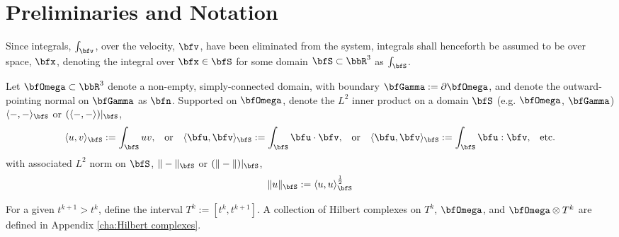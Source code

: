 \section*{Preliminaries and Notation}
    Since integrals, $\int_{\bfv}$, over the velocity, $\bfv$, have been eliminated from the system, integrals shall henceforth be assumed to be over space, $\bfx$, denoting the integral over $\bfx  \in  \bfS$ for some domain $\bfS  \subset  \bbR^{3}$ as $\int_{\bfS}$.

    Let $\bfOmega  \subset  \bbR^{3}$ denote a  non-empty, simply-connected domain, with boundary $\bfGamma  :=  \partial\bfOmega$, and denote the outward-pointing normal on $\bfGamma$ as $\bfn$. Supported on $\bfOmega$, denote the $L^{2}$ inner product on a domain $\bfS$ (e.g. $\bfOmega$, $\bfGamma$) $\langle-, -\rangle_{\bfS}$ or $(\langle-, -\rangle)|_{\bfS}$,
    \begin{align}
        \langle u, v\rangle_{\bfS}  :=  \int_{\bfS}uv,  &&
        \text{or}  &&
        \langle \bfu, \bfv\rangle_{\bfS}  :=  \int_{\bfS}\bfu\cdot\bfv,  &&
        \text{or}  &&
        \langle \bfu, \bfv\rangle_{\bfS}  :=  \int_{\bfS}\bfu:\bfv,  &&
        \text{etc.}
    \end{align}
    with associated $L^{2}$ norm on $\bfS$, $\|-\|_{\bfS}$ or $(\|-\|)|_{\bfS}$,
    \begin{equation}
        \|u\|_{\bfS}  :=  \langle u, u\rangle_{\bfS}^{\frac{1}{2}}
    \end{equation}

    For a given $t^{k + 1} > t^{k}$, define the interval $T^{k}  :=  \left[t^{k}, t^{k + 1}\right]$. A collection of Hilbert complexes on $T^{k}$, $\bfOmega$, and $\bfOmega\otimes T^{k}$ are defined in Appendix \ref{cha:Hilbert complexes}.
    